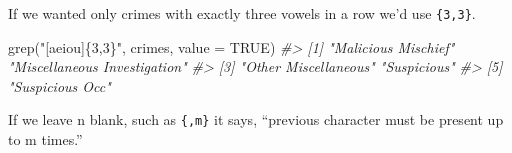 \documentclass[
]{krantz}
\makeatletter
\newenvironment{Shaded}{\begin{snugshade}}{\end{snugshade}}
\newcommand{\AttributeTok}[1]{\textcolor[rgb]{0.61,0.61,0.61}{#1}}
\newcommand{\CommentTok}[1]{\textcolor[rgb]{0.37,0.37,0.37}{\textit{#1}}}
\newcommand{\ConstantTok}[1]{\textcolor[rgb]{0,0,0}{#1}}
\newcommand{\FunctionTok}[1]{\textcolor[rgb]{0,0,0}{#1}}
\newcommand{\NormalTok}[1]{#1}
\newcommand{\StringTok}[1]{\textcolor[rgb]{0.5,0.5,0.5}{#1}}
\newenvironment{kframe}{%
\medskip{}
\setlength{\fboxsep}{.8em}
 \def\at@end@of@kframe{}%
 \ifinner\ifhmode%
  \def\at@end@of@kframe{\end{minipage}}%
  \begin{minipage}{\columnwidth}%
 \fi\fi%
 \def\FrameCommand##1{\hskip\@totalleftmargin \hskip-\fboxsep
 \colorbox{shadecolor}{##1}\hskip-\fboxsep
     \hskip-\linewidth \hskip-\@totalleftmargin \hskip\columnwidth}%
 \MakeFramed {\advance\hsize-\width
   \@totalleftmargin\z@ \linewidth\hsize
   \@setminipage}}%
 {\par\unskip\endMakeFramed%
 \at@end@of@kframe}
\renewenvironment{Shaded}{\begin{kframe}}{\end{kframe}}
\makeatother
\begin{document}
If we wanted only crimes with exactly three vowels in a row we'd use \texttt{\{3,3\}}.

\begin{Shaded}
\begin{Highlighting}[]
\FunctionTok{grep}\NormalTok{(}\StringTok{"[aeiou]\{3,3\}"}\NormalTok{, crimes, }\AttributeTok{value =} \ConstantTok{TRUE}\NormalTok{)}
\CommentTok{\#\textgreater{} [1] "Malicious Mischief"          "Miscellaneous Investigation"}
\CommentTok{\#\textgreater{} [3] "Other Miscellaneous"         "Suspicious"                 }
\CommentTok{\#\textgreater{} [5] "Suspicious Occ"}
\end{Highlighting}
\end{Shaded}

If we leave n blank, such as \texttt{\{,m\}} it says, ``previous character must be present up to m times.''
\end{document}

